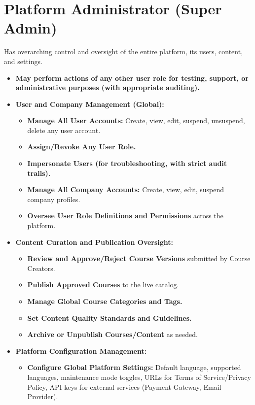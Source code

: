 \documentclass[12pt, a4paper]{report} %
\begin{document}
\section{Platform Administrator (Super Admin)}
Has overarching control and oversight of the entire platform, its users, content, and settings.
  \begin{itemize}
    \item \textbf{May perform actions of any other user role for testing, support, or administrative purposes (with appropriate auditing).}
    \item \textbf{User and Company Management (Global):}
        \begin{itemize}
            \item \textbf{Manage All User Accounts:} Create, view, edit, suspend, unsuspend, delete any user account.
            \item \textbf{Assign/Revoke Any User Role.}
            \item \textbf{Impersonate Users (for troubleshooting, with strict audit trails).}
            \item \textbf{Manage All Company Accounts:} Create, view, edit, suspend company profiles.
            \item \textbf{Oversee User Role Definitions and Permissions} across the platform.
        \end{itemize}
    \item \textbf{Content Curation and Publication Oversight:}
        \begin{itemize}
            \item \textbf{Review and Approve/Reject Course Versions} submitted by Course Creators.
            \item \textbf{Publish Approved Courses} to the live catalog.
            \item \textbf{Manage Global Course Categories and Tags.}
            \item \textbf{Set Content Quality Standards and Guidelines.}
            \item \textbf{Archive or Unpublish Courses/Content} as needed.
        \end{itemize}
    \item \textbf{Platform Configuration Management:}
        \begin{itemize}
            \item \textbf{Configure Global Platform Settings:} Default language, supported languages, maintenance mode toggles, URLs for Terms of Service/Privacy Policy, API keys for external services (Payment Gateway, Email Provider).

\end{itemize}
\end{itemize}
\end{document}
